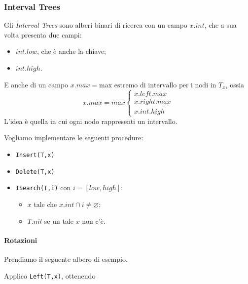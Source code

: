 \subsubsection{Interval Trees} \label{intervaltrees}
Gli \emph{Interval Trees} sono alberi binari di ricerca con un campo $x.int$, che a sua 
volta presenta due campi:
\begin{itemize}[noitemsep]
    \item $int.low$, che è anche la chiave;
    \item $int.high$.
\end{itemize}
E anche di un campo $x.max = \text{max estremo di intervallo per i nodi in } T_x$, ossia
$$x.max = max 
\begin{cases}
    x.left.max \\
    x.right.max \\
    x.int.high
\end{cases}$$
L'idea è quella in cui ogni nodo rappresenti un intervallo. \par
Vogliamo implementare le seguenti procedure:
\begin{itemize}
    \item \texttt{Insert(T,x)}
    \item \texttt{Delete(T,x)}
    \item \texttt{ISearch(T,i)} con $i = [low, high]$:
    \begin{itemize}
        \item $x$ tale che $x.int \cap i \neq \varnothing$;
        \item $T.nil$ se un tale $x$ non c'è.
    \end{itemize}
\end{itemize} 

\paragraph{Rotazioni} Prendiamo il seguente albero di esempio.

\begin{center}
\end{center}
Applico \texttt{Left(T,x)}, ottenendo
\begin{center}
\end{center}

